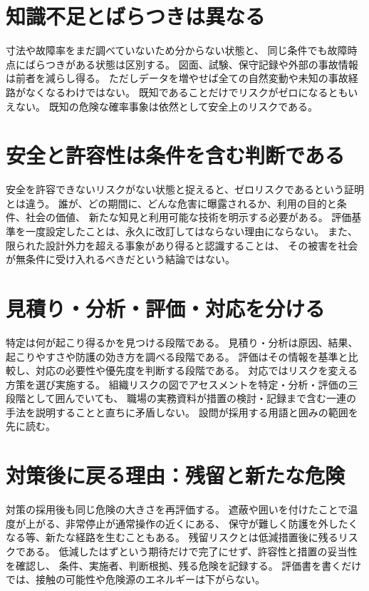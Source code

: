 \section{知識不足とばらつきは異なる}
寸法や故障率をまだ調べていないため分からない状態と、
同じ条件でも故障時点にばらつきがある状態は区別する。
図面、試験、保守記録や外部の事故情報は前者を減らし得る。
ただしデータを増やせば全ての自然変動や未知の事故経路がなくなるわけではない。
既知であることだけでリスクがゼロになるともいえない。
既知の危険な確率事象は依然として安全上のリスクである。

\section{安全と許容性は条件を含む判断である}
\label{theory:safety:acceptability}
安全を許容できないリスクがない状態と捉えると、ゼロリスクであるという証明とは違う。
誰が、どの期間に、どんな危害に曝露されるか、利用の目的と条件、社会の価値、
新たな知見と利用可能な技術を明示する必要がある。
評価基準を一度設定したことは、永久に改訂してはならない理由にならない。
また、限られた設計外力を超える事象があり得ると認識することは、
その被害を社会が無条件に受け入れるべきだという結論ではない。

\section{見積り・分析・評価・対応を分ける}
\label{theory:safety:cycle}
特定は何が起こり得るかを見つける段階である。
見積り・分析は原因、結果、起こりやすさや防護の効き方を調べる段階である。
評価はその情報を基準と比較し、対応の必要性や優先度を判断する段階である。
対応ではリスクを変える方策を選び実施する。
組織リスクの図でアセスメントを特定・分析・評価の三段階として囲んでいても、
職場の実務資料が措置の検討・記録まで含む一連の手法を説明することと直ちに矛盾しない。
設問が採用する用語と囲みの範囲を先に読む。

\section{対策後に戻る理由：残留と新たな危険}
対策の採用後も同じ危険の大きさを再評価する。
遮蔽や囲いを付けたことで温度が上がる、非常停止が通常操作の近くにある、
保守が難しく防護を外したくなる等、新たな経路を生むこともある。
残留リスクとは低減措置後に残るリスクである。
低減したはずという期待だけで完了にせず、許容性と措置の妥当性を確認し、
条件、実施者、判断根拠、残る危険を記録する。
評価書を書くだけでは、接触の可能性や危険源のエネルギーは下がらない。

